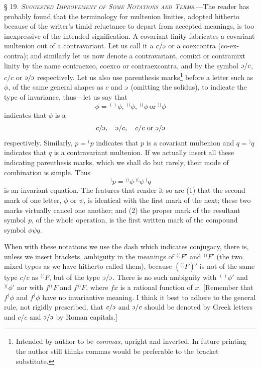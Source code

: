\documentclass[11pt]{article}
\newcommand{\invc}{\mathord{\rotatebox[origin=c]{180}{$c$}}}
\newcommand{\invc}{\mathord{\text{\invcfont ɔ}}}
\newcommand{\markpair}[3]{{}^{#1#2}#3}
\begin{document}
\noindent\textsc{§ 19. \emph{Suggested Improvement of Some Notations and Terms.}}---The reader has probably found that the terminology for multenion linities, adopted hitherto because of the writer's timid reluctance to depart from accepted meanings, is too inexpressive of the intended signification. A covariant linity fabricates a covariant multenion out of a contravariant. Let us call it a $c/\invc$ or a coexcontra (co-ex-contra); and similarly let us now denote a contravariant, comixt or contramixt linity by the name contraexco, coexco or contraexcontra, and by the symbol $\invc/c$, $c/c$ or $\invc/\invc$ respectively. Let us also use parenthesis marks\footnote{Intended by author to be \emph{commas}, upright and inverted. In future printing the author still thinks commas would be preferable to the bracket substitute.} before a letter such as $\phi$, of the same general shapes as $c$ and $\invc$ (omitting the solidus), to indicate the type of invariance, thus---let us say that
\[
  \phi=\markpair{(}{)}{\phi},\ \markpair{)}{(}{\phi},\ \markpair{(}{(}{\phi}\ \text{or}\ \markpair{)}{)}{\phi}
\]
indicates that $\phi$ is a
\[
  c/\invc,\quad \invc/c,\quad c/c\ \text{or}\ \invc/\invc
\]
respectively. Similarly, $p={}^{(}p$ indicates that $p$ is a covariant multenion and $q={}^{)}q$ indicates that $q$ is a contravariant multenion. If we actually insert all these indicating parenthesis marks, which we shall do but rarely, their mode of combination is simple. Thus
\[
  {}^{)}p=\markpair{)}{)}{\phi}\ \markpair{)}{(}{\psi}\ {}^{(}q
\]
is an invariant equation. The features that render it so are (1) that the second mark of one letter, $\phi$ or $\psi$, is identical with the first mark of the next; these two marks virtually cancel one another; and (2) the proper mark of the resultant symbol $p$, of the whole operation, is the first written mark of the compound symbol $\phi\psi q$.

\indent When with these notations we use the dash which indicates conjugacy, there is, unless we insert brackets, ambiguity in the meanings of $\markpair{(}{(}{F'}$ and $\markpair{)}{)}{F'}$ (the two mixed types as we have hitherto called them), because $(\markpair{(}{(}{F})'$ is not of the same type $c/c$ as $\markpair{(}{(}{F}$, but of the type $\invc/\invc$. There is no such ambiguity with $\markpair{(}{)}{\phi'}$ and $\markpair{)}{(}{\phi'}$ nor with $f\markpair{(}{(}{F}$ and $f\markpair{)}{)}{F}$, where $fx$ is a rational function of $x$. [Remember that $f^{(}\phi$ and $f^{)}\phi$ have no invariantive meaning. I think it best to adhere to the general rule, not rigidly prescribed, that $c/\invc$ and $\invc/c$ should be denoted by Greek letters and $c/c$ and $\invc/\invc$ by Roman capitals.]
\end{document}
